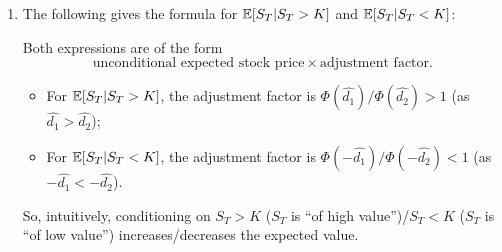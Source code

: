 \begin{enumerate}
\item The following gives the formula for \(\mathbb{E}\qty[S_T|S_T>K]\) and
\(\mathbb{E}\qty[S_T|S_T<K]\):
\begin{intuition}
Both expressions are of the form \[\text{unconditional expected stock
price}\times\text{adjustment factor}.\]
\begin{itemize}
\item For \(\mathbb{E}\qty[S_T|S_T>K]\), the adjustment factor is
\(\Phi(\hat{d_1})/\Phi(\hat{d_2})>1\) (as \(\hat{d_1}>\hat{d_2}\));
\item For \(\mathbb{E}\qty[S_T|S_T<K]\), the adjustment factor is
\(\Phi(-\hat{d_1})/\Phi(-\hat{d_2})<1\) (as \(-\hat{d_1}< -\hat{d_2}\)).
\end{itemize}
So, intuitively, conditioning on \(S_T>K\) (\(S_T\) is ``of high
value'')/\(S_T<K\) (\(S_T\) is ``of low value'') increases/decreases the
expected value.
\end{intuition}


\end{enumerate}
